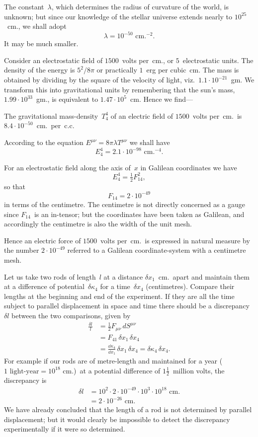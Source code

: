 \documentclass[12pt]{book}
\begin{document}
The constant~$\lambda$, which determines the radius of curvature of the world, is
unknown; but since our knowledge of the stellar universe extends nearly to
$10^{25}$~cm., we shall adopt
\[
\lambda = 10^{-50} \text{ cm.}^{-2}.
\]
It may be much smaller.

Consider an electrostatic field of $1500$~volts per~cm., or $5$~electrostatic units.
The density of the energy is $5^2/8\pi$ or practically $1$~erg per cubic~cm. The
mass is obtained by dividing by the square of the velocity of light, viz.\
$1.1 \cdot 10^{-21}$~gm. We transform this into gravitational units by remembering
that the sun's mass, $1.99 \cdot 10^{33}$~gm., is equivalent to $1.47 \cdot 10^{5}$~cm. Hence we
find---

The gravitational mass\hyp{}density~$T_{4}^{4}$ of an electric field of $1500$~volts
per~cm.\ is $8.4 \cdot 10^{-50}$~cm.\ per~c.c.

According to the equation $E^{\mu\nu} = 8\pi\lambda T^{\mu\nu}$ we shall have
\[
E_{4}^{4} = 2.1 \cdot 10^{-98} \text{ cm.}^{-4}.
\]

For an electrostatic field along the axis of~$x$ in Galilean coordinates we
have
\[
E_{4}^{4} = \tfrac{1}{2} F_{14}^{2},
\]
so that
\[
F_{14} = 2 \cdot 10^{-49}
\]
in terms of the centimetre. The centimetre is not directly concerned as a
gauge since $F_{14}$~is an in\hyp{}tensor; but the coordinates have been taken as
Galilean, and accordingly the centimetre is also the width of the unit mesh.

Hence an electric force of $1500$~volts per~cm.\ is expressed in natural
measure by the number $2 \cdot 10^{-49}$ referred to a Galilean coordinate\hyp{}system with
a centimetre mesh.

Let us take two rods of length~$l$ at a distance $\delta x_{1}$~cm.\ apart and maintain
them at a difference of potential~$\delta\kappa_{4}$ for a time~$\delta x_{4}$ (centimetres). Compare
their lengths at the beginning and end of the experiment. If they are all the
time subject to parallel displacement in space and time there should be a
discrepancy~$\delta l$ between the two comparisons, given by~\Eq{(84.4)}
\begin{align*}
  \frac{\delta l}{l}
  &= \tfrac{1}{2} F_{\mu\nu}\, dS^{\mu\nu} \\
  &= F_{41}\, \delta x_{1}\, \delta x_{4} \\
  &= \frac{\dd\kappa_{4}}{\dd x_{1}}\, \delta x_{1}\, \delta x_{4}
  = \delta\kappa_{4}\, \delta x_{4}.
\end{align*}
For example if our rods are of metre-length and maintained for a year
($1 \text{ light-year} = 10^{18} \text{ cm.}$)\ at a potential difference of $1\frac{1}{2}$~million volts, the
discrepancy is
\begin{align*}
  \delta l &= 10^2 \cdot 2 \cdot 10^{-49} \cdot 10^{3} \cdot 10^{18} \text{ cm.} \\
  &= 2 \cdot 10^{-26} \text{ cm.}
\end{align*}
We have already concluded that the length of a rod is not determined by
parallel displacement; but it would clearly be impossible to detect the discrepancy
experimentally if it were so determined.
\end{document}
